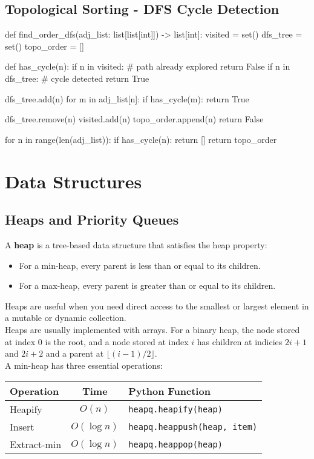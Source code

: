 \documentclass[12pt, titlepage]{article}
\newcommand{\floor}[1]{\lfloor #1 \rfloor}
\begin{document}
\subsection{Topological Sorting - DFS Cycle Detection} \label{dfs-topo}
\begin{python}
def find_order_dfs(adj_list: list[list[int]]) -> list[int]:
    visited = set()
    dfs_tree = set()
    topo_order = []

    def has_cycle(n):
        if n in visited:  # path already explored
            return False
        if n in dfs_tree:  # cycle detected
            return True

        dfs_tree.add(n)
        for m in adj_list[n]:
            if has_cycle(m):
                return True

        dfs_tree.remove(n)
        visited.add(n)
        topo_order.append(n)
        return False

    for n in range(len(adj_list)):
        if has_cycle(n):
            return []
    return topo_order
\end{python}

\section{Data Structures}

\subsection{Heaps and Priority Queues} \label{heap}

A \textbf{heap} is a tree-based data structure that satisfies the heap property:
\begin{itemize}
  \item For a min-heap, every parent is less than or equal to its children.
  \item For a max-heap, every parent is greater than or equal to its children.
\end{itemize}

Heaps are useful when you need direct access to the smallest or largest element in a mutable or dynamic collection. \\

Heaps are usually implemented with arrays. For a binary heap, the node stored at index $0$ is the root, and a node stored at index $i$ has children at indicies $2i + 1$ and $2i + 2$ and a parent at $\floor{(i - 1)/2}$. \\

A min-heap has three essential operations:
\begin{center}
\begin{tabular}{|l|c|l|}
  \hline
  \textbf{Operation} & \textbf{Time} & \textbf{Python Function} \\
  \hline
  Heapify & $O(n)$ & \texttt{heapq.heapify(heap)} \\
  Insert & $O(\log n)$ & \texttt{heapq.heappush(heap, item)} \\
  Extract-min & $O(\log n)$ & \texttt{heapq.heappop(heap)} \\
  \hline
\end{tabular}
\end{center}
\end{document}
